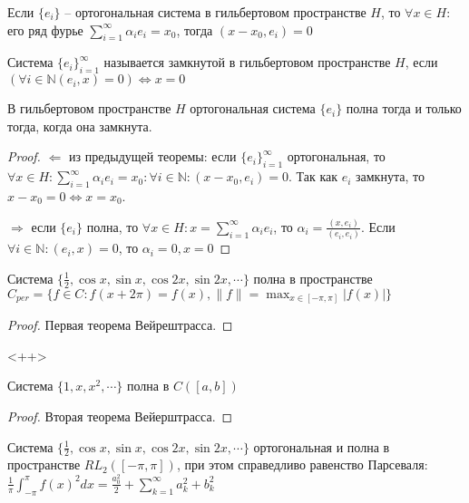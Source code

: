 \documentclass[document.tex]{subfiles}
\begin{document}
\begin{theorem}
    Если $\{e_i\}$ -- ортогональная система в гильбертовом пространстве $H$, то $\forall x \in H:$ его ряд фурье 
    $\sum_{i = 1}^{\infty} \alpha_i e_i = x_0$, тогда $(x - x_0, e_i) = 0$
\end{theorem}

\begin{definition}
    Система $\{e_i\}_{i = 1}^{\infty}$ называется замкнутой в гильбертовом пространстве $H$, если $(\forall i \in
    \mathbb{N} (e_i, x) = 0) \Leftrightarrow x = 0$
\end{definition}

\begin{theorem}
    В гильбертовом пространстве $H$ ортогональная система $\{e_i\}$ полна тогда и только тогда, когда она замкнута.
\end{theorem}

\begin{proof}
    $\Leftarrow$ из предыдущей теоремы: если $\{e_i\}_{i = 1}^{\infty}$ ортогональная, то $\forall x \in H:
    \sum_{i = 1}^{\infty}\alpha_i e_i = x_0: \forall i \in \mathbb{N}: (x - x_0, e_i) = 0$. Так как $e_i$ замкнута, то
    $x - x_0 = 0 \Leftrightarrow x = x_0$.

    $\Rightarrow$ если $\{e_i\}$ полна, то $\forall x \in H: x = \sum_{i = 1}^{\infty} \alpha_i e_i$, то $\alpha_i =
    \frac{(x, e_i)}{(e_i, e_i)}$. Если $\forall i \in \mathbb{N}: (e_i, x) = 0$, то $\alpha_i = 0, x = 0$
\end{proof}

\begin{theorem}
    Система $\{\frac{1}{2}, \cos x, \sin x, \cos 2x, \sin 2x, \cdots \}$ полна в пространстве $C_{per} = \{f
        \in C: f(x + 2\pi) = f(x), \|f\| = \max_{x \in [-\pi, \pi]} |f(x)|\}$
\end{theorem}

\begin{proof}
    Первая теорема Вейрештрасса.
\end{proof}<++>

\begin{theorem}
    Система $\{1, x, x^2, \cdots\}$ полна в $C([a, b])$
\end{theorem}

\begin{proof}
    Вторая теорема Вейерштрасса.
\end{proof}

\begin{theorem}
    Система $\{\frac{1}{2}, \cos x, \sin x, \cos 2x, \sin 2x, \cdots \}$ ортогональная и полна в пространстве
    $RL_2([-\pi, \pi])$, при этом справедливо равенство Парсеваля: $\frac{1}{\pi}\int_{-\pi}^{\pi}f(x)^2 dx =
    \frac{a_0^2}{2} +
    \sum_{k = 1}^{\infty} a_k^2 + b_k^2$
\end{theorem}
\end{document}
